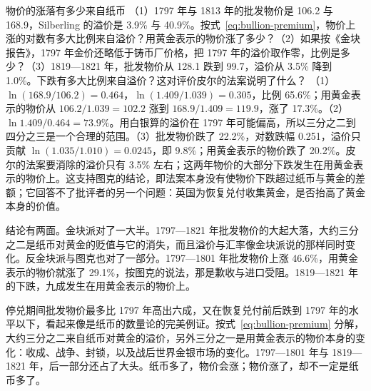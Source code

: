 \begin{example}{物价的涨落有多少来自纸币}\label{ex:bullion-decomp}
（1）1797 年与 1813 年的批发物价是 106.2 与 168.9，Silberling 的溢价是 3.9\% 与 40.9\%。按式~\eqref{eq:bullion-premium}，物价上涨的对数有多大比例来自溢价？用黄金表示的物价涨了多少？（2）如果按《金块报告》，1797 年金价还略低于铸币厂价格，把 1797 年的溢价取作零，比例是多少？（3）1819—1821 年，批发物价从 128.1 跌到 99.7，溢价从 3.5\% 降到 1.0\%。下跌有多大比例来自溢价？这对评价皮尔的法案说明了什么？
\solution （1）$\ln(168.9/106.2)=0.464$，$\ln(1.409/1.039)=0.305$，比例 65.6\%；用黄金表示的物价从 $106.2/1.039=102.2$ 涨到 $168.9/1.409=119.9$，涨了 17.3\%。（2）$\ln1.409/0.464=73.9\%$。用白银算的溢价在 1797 年可能偏高，所以三分之二到四分之三是一个合理的范围。（3）批发物价跌了 22.2\%，对数跌幅 0.251，溢价只贡献 $\ln(1.035/1.010)=0.0245$，即 9.8\%；用黄金表示的物价跌了 20.2\%。皮尔的法案要消除的溢价只有 3.5\% 左右；这两年物价的大部分下跌发生在用黄金表示的物价上。这支持图克的结论，即法案本身没有使物价下跌超过纸币与黄金的差额；它回答不了批评者的另一个问题：英国为恢复兑付收集黄金，是否抬高了黄金本身的价值。
\end{example}

结论有两面。金块派对了一大半。1797—1821 年批发物价的大起大落，大约三分之二是纸币对黄金的贬值与它的消失，而且溢价与汇率像金块派说的那样同时变化。反金块派与图克也对了一部分。1797—1801 年批发物价上涨 46.6\%，用黄金表示的物价就涨了 29.1\%，按图克的说法，那是歉收与进口受阻。1819—1821 年的下跌，九成发生在用黄金表示的物价上。


\begin{pitfall}[停兑期间物价的涨落都是纸币造成的]
停兑期间批发物价最多比 1797 年高出六成，又在恢复兑付前后跌到 1797 年的水平以下，看起来像是纸币的数量论的完美例证。按式~\eqref{eq:bullion-premium} 分解，大约三分之二来自纸币对黄金的溢价，另外三分之一是用黄金表示的物价本身的变化：收成、战争、封锁，以及战后世界金银市场的变化。1797—1801 年与 1819—1821 年，后一部分还占了大头。纸币多了，物价会涨；物价涨了，却不一定是纸币多了。
\end{pitfall}


